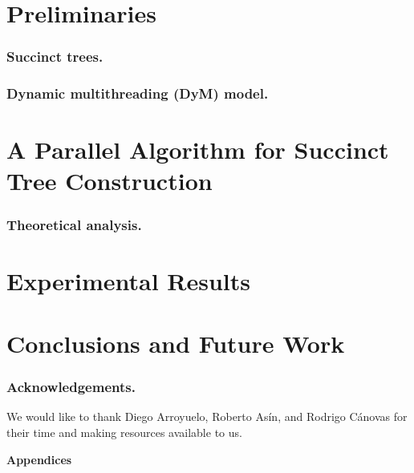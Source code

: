 \documentclass[runningheads]{llncs}
\begin{document}

\section{Preliminaries}
\label{sec:relwork}


\subsubsection{Succinct trees.}
\label{subsec:suctrees}


\subsubsection{Dynamic multithreading (DyM) model.}
\label{subsec:dym}


\section{A Parallel Algorithm for Succinct Tree Construction}
\label{sec:multicoreST}


\subsubsection{Theoretical analysis.}
\label{subsec:theoreticalAnalysis}


\section{Experimental Results}
\label{sec:exps}





\section{Conclusions and Future Work}
\label{sec:conclusion}


\subsubsection*{Acknowledgements.}
We would like to thank Diego Arroyuelo, Roberto As\'{i}n, and Rodrigo
C\'{a}novas for their time and making resources available to us.




\newpage
\appendix
\begin{center}
  \bf \Large Appendices
\end{center}


\end{document}
